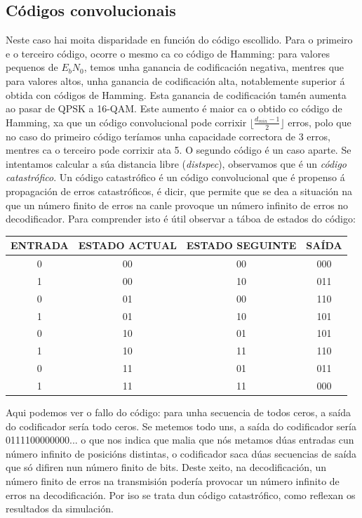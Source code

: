 \documentclass[
	10pt, %
	spanish, %
]{fphw}
\begin{document}
\subsection*{Códigos convolucionais}
Neste caso hai moita disparidade en función do código escollido. Para o primeiro e o terceiro código, ocorre o mesmo ca co código de Hamming: para valores pequenos de $E_bN_0$, temos unha ganancia de codificación negativa, mentres que para valores altos, unha ganancia de codificación alta, notablemente superior á obtida con códigos de Hamming. Esta ganancia de codificación tamén aumenta ao pasar de QPSK a 16-QAM. 
Este aumento é maior ca o obtido co código de Hamming, xa que un código convolucional pode corrixir $\lfloor \frac{d_{min} - 1}{2} \rfloor$ erros, polo que no caso do primeiro código teríamos unha capacidade correctora
de 3 erros, mentres ca o terceiro pode corrixir ata 5.
\newline
O segundo código é un caso aparte. Se intentamos calcular a súa distancia libre (\textit{distspec}), observamos que é un \textit{código catastrófico}. Un código catastrófico é un código convolucional que é propenso á propagación
de erros catastróficos, é dicir, que permite que se dea a situación na que un número finito de erros na canle provoque un número infinito de erros no decodificador. 
Para comprender isto é útil observar a táboa de estados do código:
\begin{center}
\begin{tabular}{ |c|c|c|c| }
\hline
\textbf{ENTRADA} & \textbf{ESTADO ACTUAL} & \textbf{ESTADO SEGUINTE} & \textbf{SAÍDA} \\
\hline
0 & 00 & 00 & 000 \\
\hline
1 & 00 & 10 & 011 \\
\hline
0 & 01 & 00 & 110 \\
\hline
1 & 01 & 10 & 101 \\
\hline
0 & 10 & 01 & 101 \\
\hline
1 & 10 & 11 & 110 \\
\hline
0 & 11 & 01 & 011 \\
\hline
1 & 11 & 11 & 000 \\
\hline
\end{tabular}
\end{center}
Aqui podemos ver o fallo do código: para unha secuencia de todos ceros, a saída do codificador sería todo ceros. Se metemos todo uns, a saída do codificador sería 0111100000000... o que nos indica que malia que nós metamos dúas entradas cun número infinito de posicións distintas, o codificador saca dúas secuencias de saída que só difiren nun número finito de bits. Deste xeito, na decodificación, un número finito de erros na transmisión podería provocar un número infinito de erros na decodificación. Por iso se trata dun código catastrófico, como reflexan os resultados da simulación.
\end{document}
